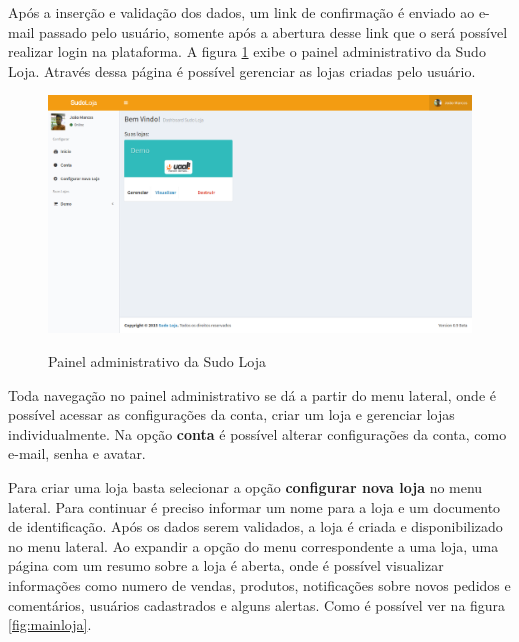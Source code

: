 \documentclass[a4paper,12pt]{monografia}
\begin{document}
Após a inserção e validação dos dados, um link de confirmação é enviado ao e-mail passado pelo usuário, somente após a abertura desse link que o será possível realizar login na plataforma. A figura \ref{fig:painel} exibe o painel administrativo da Sudo Loja. Através dessa página é possível gerenciar as lojas criadas pelo usuário.

\begin{figure}[H]
\centering
\caption{Painel administrativo da Sudo Loja}
\centering
\includegraphics[width=15cm]{img/sistema/dashboard.png.eps}\\
\label{fig:painel}
\end{figure}

Toda navegação no painel administrativo se dá a partir do menu lateral, onde é possível acessar as configurações da conta, criar um loja e gerenciar lojas individualmente. Na opção \textbf{conta} é possível alterar configurações da conta, como e-mail, senha e avatar.

Para criar uma loja basta selecionar a opção \textbf{configurar nova loja} no menu lateral. Para continuar é preciso informar um nome para a loja e um documento de identificação. Após os dados serem validados, a loja é criada e disponibilizado no menu lateral. Ao expandir a opção do menu correspondente a uma loja, uma página com um resumo sobre a loja é aberta, onde é possível visualizar informações como numero de vendas, produtos, notificações sobre novos pedidos e comentários, usuários cadastrados e alguns alertas. Como é possível ver na figura \ref{fig:mainloja}.
\end{document}
